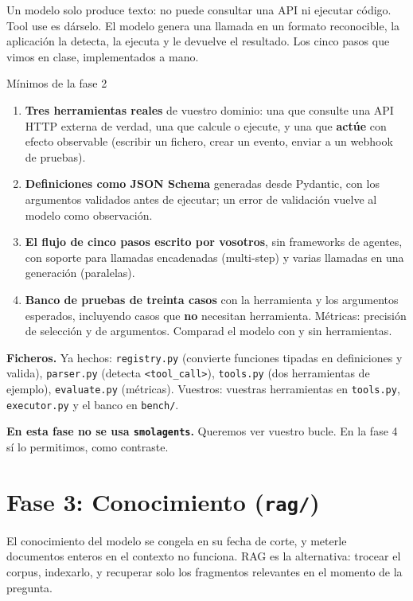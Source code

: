 \documentclass[11pt,a4paper]{article}
\newcommand{\code}[1]{{\small\texttt{#1}}}
\newcommand{\file}[1]{{\small\texttt{\textcolor{arcablue}{#1}}}}
\begin{document}
Un modelo solo produce texto: no puede consultar una API ni ejecutar código. Tool use es
dárselo. El modelo genera una llamada en un formato reconocible, la aplicación la detecta, la
ejecuta y le devuelve el resultado. Los cinco pasos que vimos en clase, implementados a mano.

\begin{minimos}{Mínimos de la fase 2}
\begin{enumerate}
  \item \textbf{Tres herramientas reales} de vuestro dominio: una que consulte una API HTTP
  externa de verdad, una que calcule o ejecute, y una que \textbf{actúe} con efecto
  observable (escribir un fichero, crear un evento, enviar a un webhook de pruebas).
  \item \textbf{Definiciones como JSON Schema} generadas desde Pydantic, con los argumentos
  validados antes de ejecutar; un error de validación vuelve al modelo como observación.
  \item \textbf{El flujo de cinco pasos escrito por vosotros}, sin frameworks de agentes, con
  soporte para llamadas encadenadas (multi-step) y varias llamadas en una generación
  (paralelas).
  \item \textbf{Banco de pruebas de treinta casos} con la herramienta y los argumentos
  esperados, incluyendo casos que \textbf{no} necesitan herramienta. Métricas: precisión de
  selección y de argumentos. Comparad el modelo con y sin herramientas.
\end{enumerate}
\end{minimos}

\textbf{Ficheros.} Ya hechos: \file{registry.py} (convierte funciones tipadas en definiciones
y valida), \file{parser.py} (detecta \code{<tool\_call>}), \file{tools.py} (dos herramientas
de ejemplo), \file{evaluate.py} (métricas). Vuestros: vuestras herramientas en
\file{tools.py}, \file{executor.py} y el banco en \file{bench/}.

\textbf{En esta fase no se usa \code{smolagents}.} Queremos ver vuestro bucle. En la fase 4 sí
lo permitimos, como contraste.

\section{Fase 3: Conocimiento (\file{rag/})}

El conocimiento del modelo se congela en su fecha de corte, y meterle documentos enteros en el
contexto no funciona. RAG es la alternativa: trocear el corpus, indexarlo, y recuperar solo
los fragmentos relevantes en el momento de la pregunta.
\end{document}
